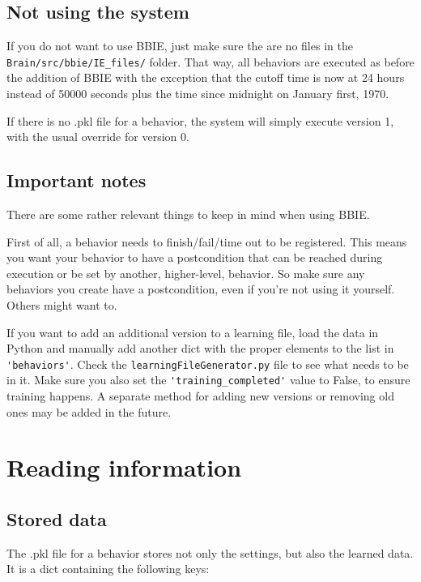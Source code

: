 \documentclass[a4paper, 12pt, oneside]{report}
\begin{document}
\section{Not using the system}

If you do not want to use BBIE, just make sure the are no files in the \verb=Brain/src/bbie/IE_files/= folder.
That way, all behaviors are executed as before the addition of BBIE with the exception that the cutoff time is now at 24 hours instead of 50000 seconds plus the time since midnight on January first, 1970.

If there is no .pkl file for a behavior, the system will simply execute version 1, with the usual override for version 0.

\section{Important notes}

There are some rather relevant things to keep in mind when using BBIE. 

First of all, a behavior needs to finish/fail/time out to be registered.
This means you want your behavior to have a postcondition that can be reached during execution or be set by another, higher-level, behavior.
So make sure any behaviors you create have a postcondition, even if you're not using it yourself.
Others might want to.

If you want to add an additional version to a learning file, load the data in Python and manually add another dict with the proper elements to the list in \verb='behaviors'=.
Check the \verb=learningFileGenerator.py= file to see what needs to be in it.
Make sure you also set the \verb='training_completed'= value to False, to ensure training happens.
A separate method for adding new versions or removing old ones may be added in the future.

\chapter{Reading information}

\section{Stored data}

The .pkl file for a behavior stores not only the settings, but also the learned data.
It is a dict containing the following keys:
\end{document}
